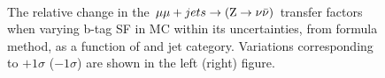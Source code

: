 \begin{figure}[!h]
  \centering
   ~~
  \\

  \caption{\label{fig:tfSyst_bsf_mumuToZinv-formula} The relative change in
  the $\mu\mu + jets \rightarrow ({\text Z} \rightarrow \nu\bar{\nu})$ transfer
  factors when varying b-tag SF in MC within its uncertainties, from formula method,
  as a function of \scalht and jet category. 
  Variations corresponding to $+1\sigma$ ($-1\sigma$) are shown in the left (right) figure. 
  }
\end{figure}

